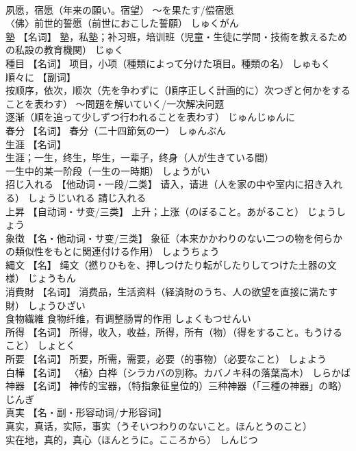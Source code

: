 \documentclass[8pt]{extreport}
\begin{document}
\begin{CJK}{UTF8}{min}
\\	夙愿，宿愿（年来の願い。宿望） ～を果たす/偿宿愿 
\\	〈佛〉前世的誓愿（前世におこした誓願）	しゅくがん	
\\	塾	【名词】 塾，私塾；补习班，培训班（児童・生徒に学問・技術を教えるための私設の教育機関）	じゅく	
\\	種目	【名词】 项目，小项（種類によって分けた項目。種類の名）	しゅもく	
\\	順々に	【副词】 
\\	按顺序，依次，顺次（先を争わずに（順序正しく計画的に）次つぎと何かをすることを表わす） ～問題を解いていく/一次解决问题 
\\	逐渐（順を追って少しずつ行われることを表わす）	じゅんじゅんに	
\\	春分	【名词】 春分（二十四節気の一）	しゅんぶん	
\\	生涯	【名词】 
\\	生涯；一生，终生，毕生，一辈子，终身（人が生きている間） 
\\	一生中的某一阶段（一生の一時期）	しょうがい	
\\	招じ入れる	【他动词・一段/二类】 请入，请进（人を家の中や室内に招き入れる）	しょうじいれる	請じ入れる
\\	上昇	【自动词・サ变/三类】 上升；上涨（のぼること。あがること）	じょうしょう	
\\	象徴	【名・他动词・サ变/三类】 象征（本来かかわりのない二つの物を何らかの類似性をもとに関連付ける作用）	しょうちょう	
\\	縄文	【名】 绳文（撚りひもを、押しつけたり転がしたりしてつけた土器の文様）	じょうもん	
\\	消費財	【名词】 消费品，生活资料（経済財のうち、人の欲望を直接に満たす財）	しょうひざい	
\\	食物繊維	食物纤维，有调整肠胃的作用	しょくもつせんい	
\\	所得	【名词】 所得，收入，收益，所得，所有（物）（得をすること。もうけること）	しょとく	
\\	所要	【名词】 所要，所需，需要，必要（的事物）（必要なこと）	しょよう	
\\	白樺	【名词】 〈植〉白桦（シラカバの別称。カバノキ科の落葉高木）	しらかば	
\\	神器	【名词】 神传的宝器，（特指象征皇位的）三种神器（「三種の神器」の略）	じんぎ	
\\	真実	【名・副・形容动词/ナ形容词】 
\\	真实，真话，实际，事实（うそいつわりのないこと。ほんとうのこと） 
\\	实在地，真的，真心（ほんとうに。こころから）	しんじつ	

\end{CJK}
\end{document}
